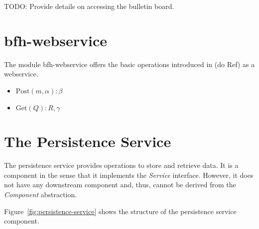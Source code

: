 \documentclass[oneside]{scrreprt}
\newcommand{\fig}[1]{Figure~\ref{#1}}
\begin{document}
TODO: Provide details on accessing the bulletin board.

\section{bfh-webservice}
The module bfh-webservice offers the basic operations introduced in (do Ref) as a webservice.
\begin{itemize}
	\item $\mathrm{Post}(m,\alpha):\beta$
	\item $\mathrm{Get}(Q):R, \gamma$
\end{itemize}

%
%
%
%
%
\section{The Persistence Service}

The persistence service provides operations to store and
retrieve data. It is a component in the sense that it
implements the \emph{Service} interface. However, it
does not have any downstream component and, thus, cannot be
derived from the \emph{Component} abstraction.

\fig{fig:persistence-service} shows the structure of the persistence service
component.
\end{document}
